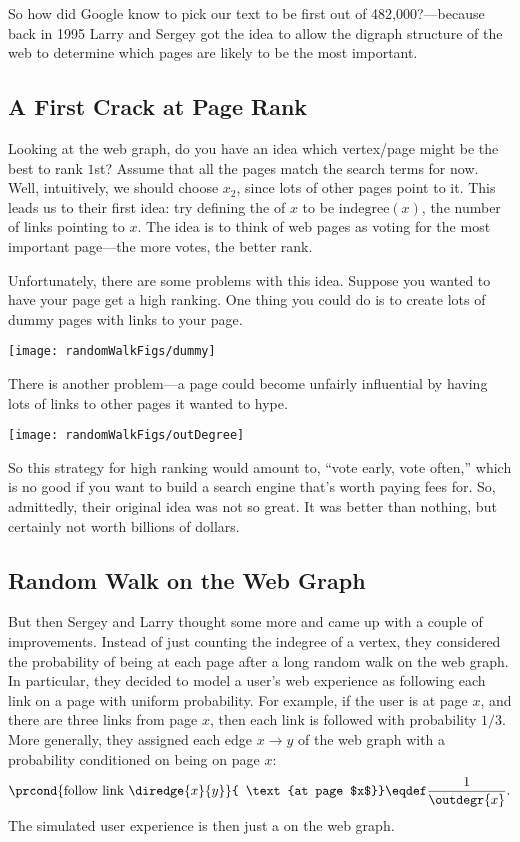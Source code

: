 So how did Google know to pick our text to be first out of
482,000?---because back in 1995 Larry and Sergey got the idea to allow
the digraph structure of the web to determine which pages are likely
to be the most important.

\subsection{A First Crack at Page Rank}

Looking at the web graph, do you have an idea which vertex/page might
be the best to rank $1$st?  Assume that all the pages match the search
terms for now.  Well, intuitively, we should choose $x_2$, since lots
of other pages point to it.  This leads us to their first idea: try
defining the  of $x$ to be $\text{indegree}(x)$, the
number of links pointing to $x$.  The idea is to think of web pages as
voting for the most important page---the more votes, the better rank.

Unfortunately, there are some problems with this idea.  Suppose you
wanted to have your page get a high ranking.  One thing you could do
is to create lots of dummy pages with links to your page.
\begin{center}
\texttt{[image: randomWalkFigs/dummy]}
\end{center}

There is another problem---a page could become unfairly influential by
having lots of links to other pages it wanted to hype.
\begin{center}
\texttt{[image: randomWalkFigs/outDegree]}
\end{center}

So this strategy for high ranking would amount to, ``vote early, vote
often,'' which is no good if you want to build a search engine that's
worth paying fees for.  So, admittedly, their original idea was not so
great.  It was better than nothing, but certainly not worth billions of
dollars.

\subsection{Random Walk on the Web Graph}

But then Sergey and Larry thought some more and came up with a couple
of improvements.  Instead of just counting the indegree of a vertex,
they considered the probability of being at each page after a long
random walk on the web graph.  In particular, they decided to model a
user's web experience as following each link on a page with uniform
probability.  For example, if the user is at page $x$, and there are
three links from page $x$, then each link is followed with probability
$1/3$.  More generally, they assigned each edge $x \rightarrow y$ of
the web graph with a probability conditioned on being on page $x$:
\[
\prcond{\text{follow link}\ \diredge{x}{y}}{ \text{at page $x$}} \eqdef
\frac{1}{\outdegr{x}}.
\]
The simulated user experience is then just a  on the
web graph.

